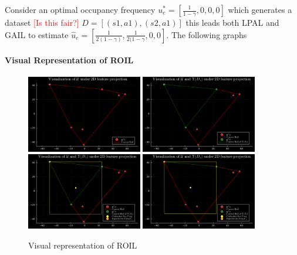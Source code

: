 \documentclass[11pt]{uai2023}
\newcommand{\gersi}[1]{\textcolor{red}{[#1]}}
\begin{document}
Consider an optimal occupancy frequency $u^*_e = [\frac{1}{1-\gamma}, 0, 0, 0]$ which generates a dataset \gersi{Is this fair?} $D = [(s1, a1), (s2, a1)]$
this leads both LPAL and GAIL to estimate $\hat{u}_e = [\frac{1}{2(1-\gamma)}, \frac{1}{2(1-\gamma}, 0, 0]$. The following graphs

\paragraph{Visual Representation of ROIL}

\begin{figure}[htbp]
	\centering
	\includegraphics[width=0.45\textwidth]{../notebooks/plots/visual_U.pdf}
	\includegraphics[width=0.45\textwidth]{../notebooks/plots/visual_U_and_Upsilon.pdf}
	\includegraphics[width=0.45\textwidth]{../notebooks/plots/visual_solve_cheb.pdf}
	\includegraphics[width=0.45\textwidth]{../notebooks/plots/visual_solve_cheb_outside_upsilon.pdf}
	\caption{Visual representation of ROIL}
	\label{fig:visual_representation_of_ROIL}
\end{figure}
\end{document}
